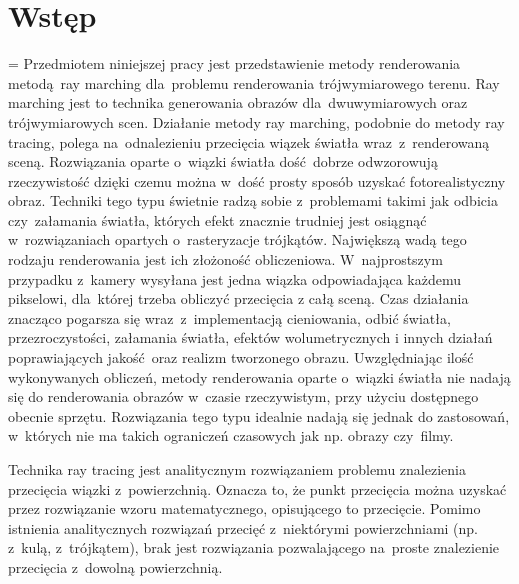 \chapter{Wstęp}
\label{ch:wstep}
\emergencystretch=\maxdimen
Przedmiotem niniejszej pracy jest przedstawienie metody renderowania metodą ray marching dla~problemu renderowania trójwymiarowego terenu.
Ray marching jest to technika generowania obrazów dla~dwuwymiarowych oraz trójwymiarowych scen.
Działanie metody ray marching, podobnie do metody ray tracing, polega na~odnalezieniu przecięcia wiązek światła wraz~z~renderowaną sceną.
Rozwiązania oparte o~wiązki światła dość dobrze odwzorowują rzeczywistość dzięki czemu można w~dość prosty sposób uzyskać fotorealistyczny obraz.
Techniki tego typu świetnie radzą sobie z~problemami takimi jak odbicia czy~załamania światła, których efekt znacznie trudniej jest osiągnąć w~rozwiązaniach opartych o~rasteryzacje trójkątów.
Największą wadą tego rodzaju renderowania jest ich złożoność obliczeniowa. W~najprostszym przypadku z~kamery wysyłana jest jedna wiązka odpowiadająca każdemu pikselowi, dla~której trzeba obliczyć przecięcia z całą sceną.
Czas działania znacząco pogarsza się wraz~z~implementacją cieniowania, odbić światła, przezroczystości, załamania światła, efektów wolumetrycznych i innych działań poprawiających jakość oraz realizm tworzonego obrazu.
Uwzględniając ilość wykonywanych obliczeń, metody renderowania oparte o~wiązki światła nie nadają się do renderowania obrazów w~czasie rzeczywistym, przy użyciu dostępnego obecnie sprzętu.
Rozwiązania tego typu idealnie nadają się jednak do zastosowań, w~których nie ma takich ograniczeń czasowych jak np. obrazy czy~filmy.

Technika ray tracing jest analitycznym rozwiązaniem problemu znalezienia przecięcia wiązki z~powierzchnią.
Oznacza to, że punkt przecięcia można uzyskać przez rozwiązanie wzoru matematycznego, opisującego to przecięcie.
Pomimo istnienia analitycznych rozwiązań przecięć z~niektórymi powierzchniami (np. z~kulą, z~trójkątem), brak jest rozwiązania
pozwalającego na~proste znalezienie przecięcia z~dowolną powierzchnią.

